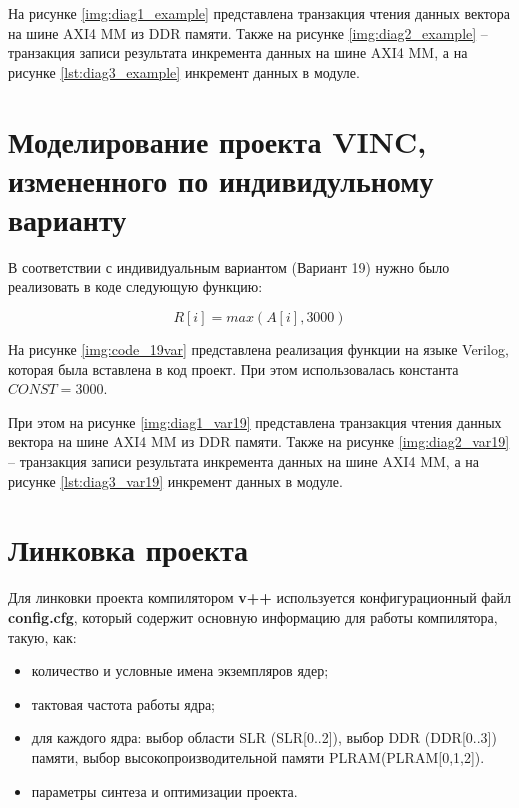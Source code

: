 На рисунке \ref{img:diag1_example} представлена транзакция чтения данных вектора на шине AXI4 MM из DDR памяти. Также на рисунке \ref{img:diag2_example} -- транзакция записи результата инкремента данных на шине AXI4 MM, а на рисунке \ref{lst:diag3_example} инкремент данных в модуле.


\clearpage


\section{Моделирование проекта VINC, измененного по индивидульному варианту}

В соответствии с индивидуальным вариантом (Вариант 19) нужно было реализовать в коде следующую функцию:

\begin{equation}
	R[i] = max(A[i], 3000)
\end{equation}


На рисунке \ref{img:code_19var} представлена реализация функции на языке Verilog, которая была вставлена в код проект. При этом использовалась константа $CONST = 3000$.



При этом на рисунке \ref{img:diag1_var19} представлена транзакция чтения данных вектора на шине AXI4 MM из DDR памяти. Также на рисунке \ref{img:diag2_var19} -- транзакция записи результата инкремента данных на шине AXI4 MM, а на рисунке \ref{lst:diag3_var19} инкремент данных в модуле.


\clearpage


\section{Линковка проекта}

Для линковки проекта компилятором \textbf{v++} используется конфигурационный файл \textbf{config.cfg}, который содержит основную информацию для работы компилятора, такую, как:
\begin{itemize}
	\item количество и условные имена экземпляров ядер;
	\item тактовая частота работы ядра;
	\item для каждого ядра: выбор области SLR (SLR[0..2]), выбор DDR (DDR[0..3]) памяти, выбор высокопроизводительной памяти PLRAM(PLRAM[0,1,2]).
	\item параметры синтеза и оптимизации проекта.
\end{itemize}

